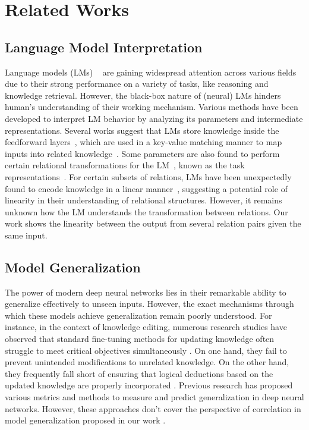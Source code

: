 \section{Related Works}
\subsection{Language Model Interpretation}
Language models (LMs) ~\citep{achiam2023gpt4,team2024gemma,olmo,dubey2024llama3} are gaining widespread attention across various fields due to their strong performance on a variety of tasks, like reasoning and knowledge retrieval. However, the black-box nature of (neural) LMs hinders human's understanding of their working mechanism. Various methods have been developed to interpret LM behavior by analyzing its parameters and intermediate representations. Several works suggest that LMs store knowledge inside the feedforward layers~\citep{key_value,knowledge_neuron,locate_edit_fact}, which are used in a key-value matching manner to map inputs into related knowledge~\citep{ffn_vocab}. Some parameters are also found to perform certain relational transformations for the LM~\cite{fv,linguistic_region}, known as the task representations~\citep{task_representation}.
For certain subsets of relations, LMs have been unexpectedly found to encode knowledge in a linear manner~\citep{linear_relation}, suggesting a potential role of linearity in their understanding of relational structures. However, it remains unknown how the LM understands the transformation between relations. Our work shows the linearity between the output from several relation pairs given the same input.

\subsection{Model Generalization}


The power of modern deep neural networks lies in their remarkable ability to generalize effectively to unseen inputs. However, the exact mechanisms through which these models achieve generalization remain poorly understood. For instance, in the context of knowledge editing, numerous research studies have observed that standard fine-tuning methods for updating knowledge often struggle to meet critical objectives simultaneously \cite{onoe2023can, hoelscher2023detecting, meng2022locating, gupta2023editing}. On one hand, they fail to prevent unintended modifications to unrelated knowledge. On the other hand, they frequently fall short of ensuring that logical deductions based on the updated knowledge are properly incorporated \cite{cohen2024evaluating, zhong2023mquake}. 
Previous research has proposed various metrics and methods to measure and predict generalization in deep neural networks. However, these approaches don't cover the perspective of correlation in model generalization proposed in our work \cite{yu2022predictingoutofdistributionerrorprojection, garg2022leveragingunlabeleddatapredict, kang2024learningdynamicsrevealgeneralization}.

